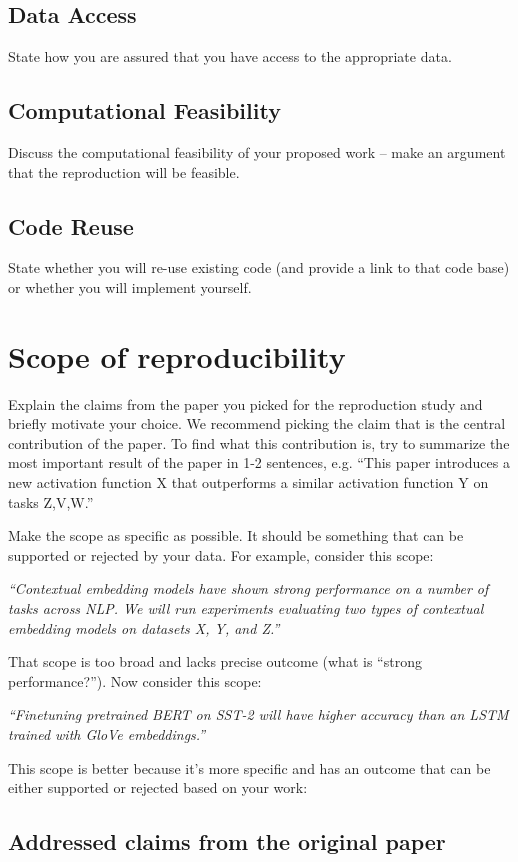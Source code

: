 \documentclass[11pt,a4paper]{article}
\begin{document}
\subsection{Data Access}
State how you are assured that you have access to the appropriate data.

\subsection{Computational Feasibility}
Discuss the computational feasibility of your proposed work – make an argument that the reproduction will be feasible.

\subsection{Code Reuse}
State whether you will re-use existing code (and provide a link to that code base) or whether you will implement yourself.

\section{Scope of reproducibility}

Explain the claims from the paper you picked for the reproduction study and briefly motivate your choice. We recommend picking the claim that is the central contribution of the paper. To find what this contribution is, try to summarize the most important result of the paper in 1-2 sentences, e.g. ``This paper introduces a new activation function X that outperforms a similar activation function Y on tasks Z,V,W.'' 

Make the scope as specific as possible. It should be something that can be supported or rejected by your data. For example, consider this scope: 

\textit{``Contextual embedding models have shown strong performance on a number of tasks across NLP. We will run experiments evaluating two types of contextual embedding models on datasets X, Y, and Z.''}


That scope is too broad and lacks precise outcome (what is ``strong performance?''). Now consider this scope:

\textit{``Finetuning pretrained BERT on SST-2 will have higher accuracy than an LSTM trained with GloVe embeddings.''}

This scope is better because it's more specific and has an outcome that can be either supported or rejected based on your work: 
\subsection{Addressed claims from the original paper}
\end{document}
